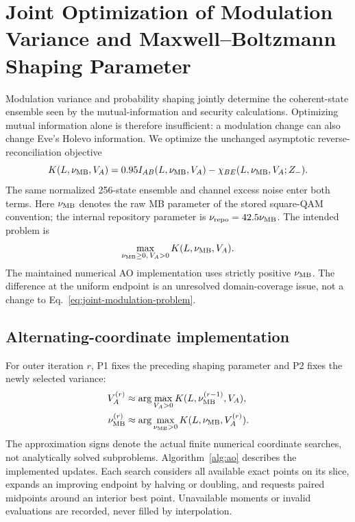 \section{Joint Optimization of Modulation Variance and Maxwell--Boltzmann Shaping Parameter}
\label{sec:joint-modulation-optimization}

Modulation variance and probability shaping jointly determine the coherent-state
ensemble seen by the mutual-information and security calculations. Optimizing
mutual information alone is therefore insufficient: a modulation change can
also change Eve's Holevo information. We optimize the unchanged asymptotic
reverse-reconciliation objective
\begin{equation}
 K(L,\nu_{\rm MB},V_A)=0.95I_{AB}(L,\nu_{\rm MB},V_A)
 -\chi_{BE}(L,\nu_{\rm MB},V_A;Z_-).
 \label{eq:joint-skr-objective}
\end{equation}
The same normalized 256-state ensemble and channel excess noise enter both
terms. Here $\nu_{\rm MB}$ denotes the raw MB parameter of the stored square-QAM
convention; the internal repository parameter is
$\nu_{\rm repo}=42.5\nu_{\rm MB}$. The intended problem is
\begin{equation}
 \max_{\nu_{\rm MB}\ge0,\,V_A>0} K(L,\nu_{\rm MB},V_A).
 \label{eq:joint-modulation-problem}
\end{equation}
The maintained numerical AO implementation uses strictly positive $\nu_{\rm MB}$.
The difference at the uniform endpoint is an unresolved domain-coverage issue,
not a change to Eq.~\eqref{eq:joint-modulation-problem}.

\subsection{Alternating-coordinate implementation}
For outer iteration $r$, P1 fixes the preceding shaping parameter and P2 fixes
the newly selected variance:
\begin{align}
 V_A^{(r)}&\approx\arg\max_{V_A>0}
 K(L,\nu_{\rm MB}^{(r-1)},V_A),\label{eq:p1}\\
 \nu_{\rm MB}^{(r)}&\approx\arg\max_{\nu_{\rm MB}>0}
 K(L,\nu_{\rm MB},V_A^{(r)}).\label{eq:p2}
\end{align}
The approximation signs denote the actual finite numerical coordinate searches,
not analytically solved subproblems. Algorithm~\ref{alg:ao} describes the
implemented updates. Each search considers all available exact points on its
slice, expands an improving endpoint by halving or doubling, and requests paired
midpoints around an interior best point. Unavailable moments or invalid
evaluations are recorded, never filled by interpolation.

